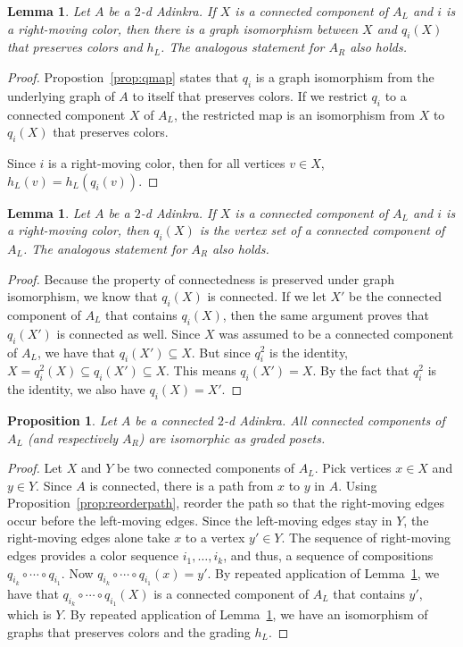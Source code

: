 \documentclass[12pt,twoside,singlespace]{article}
\numberwithin{equation}{section}
\newtheorem{lem}[equation]{Lemma}
\newtheorem{prop}[equation]{Proposition}
\theoremstyle{definition}
\begin{document}
\begin{lem}
\label{lem:qiso}
Let $A$ be a $2$-d Adinkra.  If $X$ is a connected component of $A_L$ and $i$ is a right-moving color, then there is a graph isomorphism between $X$ and $q_i(X)$ that preserves colors and $h_L$.  The analogous statement for $A_R$ also holds.
\end{lem}
\begin{proof}
Propostion~\ref{prop:qmap} states that $q_i$ is a graph isomorphism from the underlying graph of $A$ to itself that preserves colors.  If we restrict  $q_i$ to a connected component $X$ of $A_L$, the restricted map is an isomorphism from $X$ to $q_i(X)$ that preserves colors.

Since $i$ is a right-moving color, then for all vertices $v\in X$, $h_L(v)=h_L(q_i(v))$.
\end{proof}

\begin{lem}
\label{lem:qiconnected}
Let $A$ be a $2$-d Adinkra.  If $X$ is a connected component of $A_L$ and $i$ is a right-moving color, then $q_i(X)$ is the vertex set of a connected component of $A_L$. The analogous statement for $A_R$ also holds.
\end{lem}
\begin{proof}
Because the property of connectedness is preserved under graph isomorphism, we know that $q_i(X)$ is connected.  If we let $X'$ be the connected component of $A_L$ that contains $q_i(X)$, then the same argument proves that $q_i(X')$ is connected as well.  Since $X$ was assumed to be a connected component of $A_L$, we have that $q_i(X')\subseteq X$.  But since $q_i^2$ is the identity, $X=q_i^2(X)\subseteq q_i(X')\subseteq X$.  This means $q_i(X')=X$.  By the fact that $q_i^2$ is the identity, we also have $q_i(X)=X'$.
\end{proof}

\begin{prop}
\label{prop:kevin}
Let $A$ be a connected $2$-d Adinkra.  All connected components of $A_L$ (and respectively $A_R$) are isomorphic as graded posets.
\end{prop}
\begin{proof}
Let $X$ and $Y$ be two connected components of $A_L$. Pick vertices $x \in X$ and $y \in Y$. Since $A$ is connected, there is a path from $x$ to $y$ in $A$.  Using Proposition~\ref{prop:reorderpath}, reorder the path so that the right-moving edges occur before the left-moving edges. Since the left-moving edges stay in $Y$, the right-moving edges alone take $x$ to a vertex $y' \in Y$.  The sequence of right-moving edges provides a color sequence $i_1,\ldots,i_k$, and thus, a sequence of compositions $q_{i_k}\circ\cdots\circ q_{i_1}$.  Now $q_{i_k}\circ\cdots\circ q_{i_1}(x)=y'$.  By repeated application of Lemma~\ref{lem:qiconnected}, we have that $q_{i_k}\circ\cdots\circ q_{i_1}(X)$ is a connected component of $A_L$ that contains $y'$, which is $Y$.  By repeated application of Lemma~\ref{lem:qiso}, we have an isomorphism of graphs that preserves colors and the grading $h_L$.
\end{proof}
\end{document}
